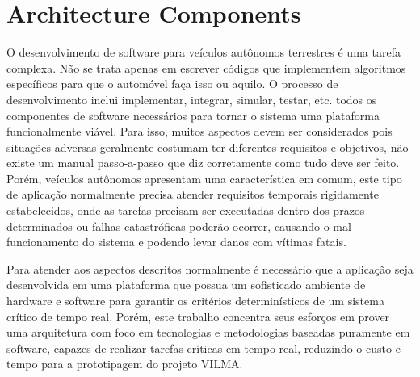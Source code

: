 \documentclass[conference]{IEEEtran}
\begin{document}

\section{Architecture Components}\label{sec:architec_components}

O desenvolvimento de software para veículos autônomos terrestres é uma tarefa complexa. Não se trata apenas em escrever códigos que implementem algoritmos específicos para que o automóvel faça isso ou aquilo. O processo de desenvolvimento inclui implementar, integrar, simular, testar, etc. todos os componentes de software necessários para tornar o sistema uma plataforma funcionalmente viável. Para isso, muitos aspectos devem ser considerados pois situações adversas geralmente costumam ter diferentes requisitos e objetivos, não existe um manual passo-a-passo que diz corretamente como tudo deve ser feito. Porém, veículos autônomos apresentam uma característica em comum, este tipo de aplicação normalmente precisa atender requisitos temporais rigidamente estabelecidos, onde as tarefas precisam ser executadas dentro dos prazos determinados ou falhas catastróficas poderão ocorrer, causando o mal funcionamento do sistema e podendo levar danos com vítimas fatais.

Para atender aos aspectos descritos normalmente é necessário que a aplicação seja desenvolvida em uma plataforma que possua um sofisticado ambiente de hardware e software para garantir os critérios determinísticos de um sistema crítico de tempo real. Porém, este trabalho concentra seus esforços em prover uma arquitetura com foco em tecnologias e metodologias baseadas puramente em software, capazes de realizar tarefas críticas em tempo real, reduzindo o custo e tempo para a prototipagem do projeto VILMA.

\end{document}
